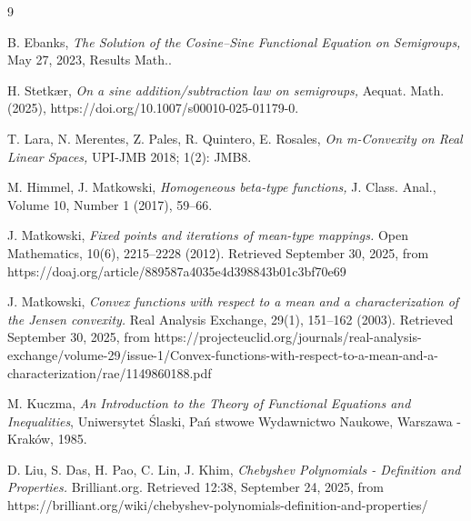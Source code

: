 \documentclass{amsart}
\theoremstyle{plain}
\numberwithin{equation}{section}
\begin{document}
\begin{thebibliography}{9}

 B. Ebanks, \textit{The Solution of the Cosine–Sine Functional Equation on Semigroups,}  May 27, 2023, Results Math..

 H. Stetkær, \textit{On a sine addition/subtraction law on semigroups,} Aequat. Math. (2025), https://doi.org/10.1007/s00010-025-01179-0.
    
 T. Lara, N. Merentes, Z. Pales, R. Quintero, E. Rosales, \textit{On m-Convexity on Real Linear Spaces, } UPI-JMB 2018; 1(2): JMB8.

 M. Himmel, J. Matkowski, \textit{Homogeneous beta-type
functions, }J. Class. Anal., Volume 10, Number 1 (2017), 59--66.

J. Matkowski,
\textit{Fixed points and iterations of mean-type mappings.}
Open Mathematics, 10(6), 2215–2228 (2012). Retrieved September 30, 2025, from https://doaj.org/article/889587a4035e4d398843b01c3bf70e69

J. Matkowski,
\textit{Convex functions with respect to a mean and a characterization of the Jensen convexity.}
Real Analysis Exchange, 29(1), 151–162 (2003). Retrieved September 30, 2025, from https://projecteuclid.org/journals/real-analysis-exchange/volume-29/issue-1/Convex-functions-with-respect-to-a-mean-and-a-characterization/rae/1149860188.pdf

 M. Kuczma, \textit{An Introduction to the Theory of
Functional Equations and Inequalities}, Uniwersytet \'{S}l{a}ski, Pa\'{n}%
stwowe Wydawnictwo Naukowe, Warszawa - Krak\'{o}w, 1985.

 D. Liu, S. Das, H. Pao, C. Lin, J. Khim,
\textit{Chebyshev Polynomials - Definition and Properties.}
 Brilliant.org. Retrieved 12:38, September 24, 2025, from https://brilliant.org/wiki/chebyshev-polynomials-definition-and-properties/

\end{thebibliography}
\end{document}
